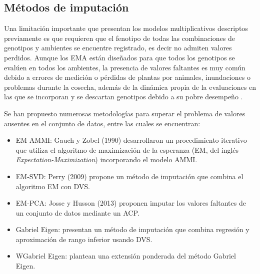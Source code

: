 \subsection{Métodos de imputación}


Una limitación importante que presentan los modelos multiplicativos descriptos previamente es que requieren que el fenotipo de todas las combinaciones de genotipos y ambientes se encuentre registrado, es decir no admiten valores perdidos. Aunque los EMA están diseñados para que todos los genotipos se evalúen en todos los ambientes, la presencia de valores faltantes es muy común debido a errores de medición o pérdidas de plantas por animales, inundaciones o problemas durante la cosecha, además de la dinámica propia de la evaluaciones en las que se incorporan y se descartan genotipos debido a su pobre desempeño \citep{HillRosenberg1985}.

Se han propuesto numerosas metodologías para superar el problema de valores ausentes en el conjunto de datos, entre las cuales se encuentran:

\begin{itemize}
\item EM-AMMI: Gauch y Zobel (1990) desarrollaron un procedimiento iterativo que utiliza el algoritmo de maximización de la esperanza (EM, del inglés \emph{Expectation-Maximization}) incorporando el modelo AMMI. 
\end{itemize}
\begin{itemize}
\item EM-SVD: Perry (2009) propone un método de imputación que combina el algoritmo EM con DVS. 
\end{itemize}
\begin{itemize}
\item EM-PCA: Josse y Husson (2013) proponen imputar los valores faltantes de un conjunto de datos mediante un ACP.
\end{itemize}
\begin{itemize}
\item Gabriel Eigen: \citet{Alarconetal2010} presentan un método de imputación que combina regresión y aproximación de rango inferior usando DVS. 
\end{itemize}
\begin{itemize}
\item WGabriel Eigen: \citet{Alarconetal2014} plantean una extensión ponderada del método Gabriel Eigen.
\end{itemize}





